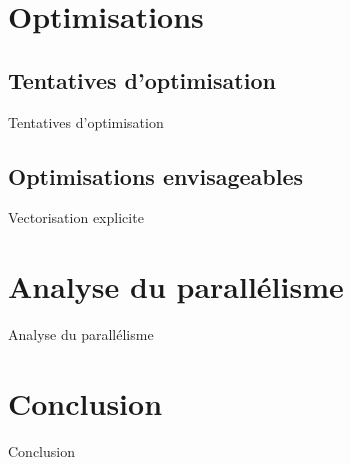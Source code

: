 \documentclass[9.5pt]{beamer}
\begin{document}
\section{Optimisations}
	\subsection{Tentatives d'optimisation}
		\begin{frame}{Tentatives d'optimisation}
		\end{frame}

	\subsection{Optimisations envisageables}
		\begin{frame}{Vectorisation explicite}
		\end{frame}

\section{Analyse du parallélisme}
	\begin{frame}{Analyse du parallélisme}
	\end{frame}

\section{Conclusion}
	\begin{frame}{Conclusion}
	\end{frame}
\end{document}
